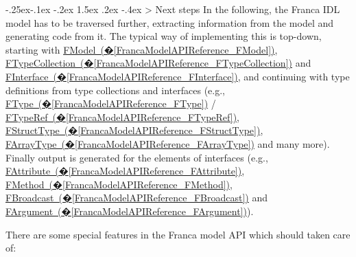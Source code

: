 \documentclass[a4paper,10pt]{scrreprt}
\makeatletter
\renewcommand\subsection{\medskip\@startsection{subsection}{2}{\z@}%
  {-.25ex\@plus -.1ex \@minus -.2ex}%
  {1.5ex \@plus .2ex \@minus -.4ex}%
  {\ifnum \scr@compatibility>\@nameuse{scr@v@2.96}\relax
    \setlength{\parfillskip}{\z@ plus 1fil}\fi
    \raggedsection\normalfont\sectfont\nobreak\size@subsection
  }%
}
\makeatother
\begin{document}
\subsection{Next steps}
\label{BuildingGenerators_TraversingFrancaModels_NextSteps}
In the following, the Franca IDL model has to be traversed further, extracting information
from the model and generating code from it.
The typical way of implementing this is top-down, starting with
\hyperref[FrancaModelAPIReference_FModel]{FModel~(�\ref*{FrancaModelAPIReference_FModel})},
\hyperref[FrancaModelAPIReference_FTypeCollection]{FTypeCollection~(�\ref*{FrancaModelAPIReference_FTypeCollection})} and
\hyperref[FrancaModelAPIReference_FInterface]{FInterface~(�\ref*{FrancaModelAPIReference_FInterface})},
and continuing with type definitions from type collections and interfaces (e.g., 
\hyperref[FrancaModelAPIReference_FType]{FType~(�\ref*{FrancaModelAPIReference_FType})} / \hyperref[FrancaModelAPIReference_FTypeRef]{FTypeRef~(�\ref*{FrancaModelAPIReference_FTypeRef})},
\hyperref[FrancaModelAPIReference_FStructType]{FStructType~(�\ref*{FrancaModelAPIReference_FStructType})},
\hyperref[FrancaModelAPIReference_FArrayType]{FArrayType~(�\ref*{FrancaModelAPIReference_FArrayType})} and many more).
Finally output is generated for the elements of interfaces (e.g., 
\hyperref[FrancaModelAPIReference_FAttribute]{FAttribute~(�\ref*{FrancaModelAPIReference_FAttribute})},
\hyperref[FrancaModelAPIReference_FMethod]{FMethod~(�\ref*{FrancaModelAPIReference_FMethod})}, 
\hyperref[FrancaModelAPIReference_FBroadcast]{FBroadcast~(�\ref*{FrancaModelAPIReference_FBroadcast})} and
\hyperref[FrancaModelAPIReference_FArgument]{FArgument~(�\ref*{FrancaModelAPIReference_FArgument})}).

There are some special features in the Franca model API which should taken care of:
\end{document}
